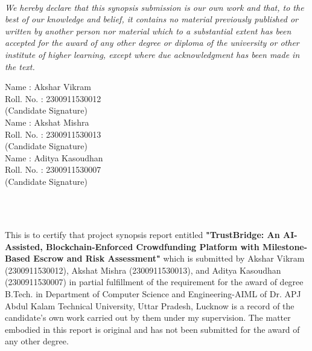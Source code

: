 \begin{center}
\chapter*{}   
\end{center}\\
\\
\doublespacing
\textit{We hereby declare that this synopsis submission is our own work and that, to the best of our knowledge and belief, it contains no material previously published or written by another person nor material which to a substantial extent has been accepted for the award of any other degree or diploma of the university or other institute of higher learning, except where due acknowledgment has been made in the text.}
\\
\begin{flushleft}
Name : Akshar Vikram\\
Roll. No. : 2300911530012  \\
\vspace{5mm}
(Candidate Signature) \\
\vspace{5mm}
Name : Akshat Mishra\\
Roll. No. : 2300911530013  \\
\vspace{5mm}
(Candidate Signature) \\
\vspace{5mm}
Name : Aditya Kasoudhan\\
Roll. No. : 2300911530007  \\
\vspace{5mm}
(Candidate Signature) \\
\vspace{5mm}
\end{flushleft}
\restoregeometry
\newpage
\begin{center}
\chapter*{} 
\end{center}\\
\\
\doublespacing
This is to certify that project synopsis report entitled \textbf{"TrustBridge: An AI-Assisted, Blockchain-Enforced Crowdfunding Platform with Milestone-Based Escrow and Risk Assessment"} which is submitted by Akshar Vikram (2300911530012), Akshat Mishra (2300911530013), and Aditya Kasoudhan (2300911530007) in partial fulfillment of the requirement for the award of degree B.Tech. in Department of Computer Science and Engineering-AIML of Dr. APJ Abdul Kalam Technical University, Uttar Pradesh, Lucknow is a record of the candidate's own work carried out by them under my supervision. The matter embodied in this report is original and has not been submitted for the award of any other degree.

